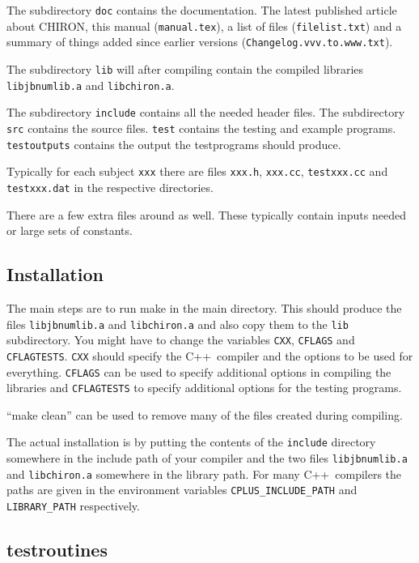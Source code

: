 \documentclass[12pt,a4paper]{article}
\newcommand{\mytt}[1]{\texttt{#1}}
\newcommand{\cpp}{\textsc{C++}}
\begin{document}
The subdirectory \mytt{doc}
contains the documentation. The latest published article
about \textsc{CHIRON}, this manual (\mytt{manual.tex}), a list of files
(\mytt{filelist.txt}) and a summary of things added since earlier versions
(\mytt{Changelog.vvv.to.www.txt}).

The subdirectory \mytt{lib} will after compiling contain the compiled
libraries \mytt{libjbnumlib.a} and \mytt{libchiron.a}.

The subdirectory \mytt{include} contains all the needed header files.
The subdirectory \mytt{src} contains the source files. \mytt{test} contains
the testing and example programs. \mytt{testoutputs} contains the output
the testprograms should produce.

Typically for each subject \mytt{xxx} there are files \mytt{xxx.h},
\mytt{xxx.cc}, \mytt{testxxx.cc} and \mytt{testxxx.dat} in the
respective directories.

There are a few extra files around as well. These typically contain
inputs needed or large sets of constants.

\subsection{Installation}
\label{installation}

The main steps are to run make in the main directory.
This should produce the files \mytt{libjbnumlib.a} and \mytt{libchiron.a}
and also copy them to the \mytt{lib} subdirectory.
You might have to change the variables \mytt{CXX}, \mytt{CFLAGS} and
\mytt{CFLAGTESTS}. \mytt{CXX} should specify the \cpp\
compiler and the options to be used for everything.
\mytt{CFLAGS} can be used to specify additional options in compiling the
libraries and \mytt{CFLAGTESTS} to specify additional options
for the testing programs.

``make clean'' can be used to remove many of the files created during compiling.

The actual installation is by putting the contents of the \mytt{include}
directory somewhere in the include path of your compiler and the two
files \mytt{libjbnumlib.a} and \mytt{libchiron.a} somewhere in the library
path. For many \cpp\ compilers the paths are given in the environment
variables \mytt{CPLUS\_INCLUDE\_PATH} and \mytt{LIBRARY\_PATH} respectively.

\subsection{testroutines}
\label{testroutines}
\end{document}
